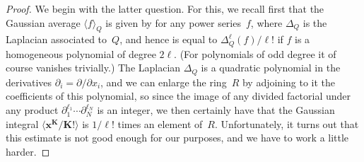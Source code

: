\documentclass[pdftex]{sigma}
\numberwithin{equation}{section}
\def\D{\Delta}
\def\pt{\partial}
\def\bK{\mathbf K}
\def\bx{\mathbf x}
\begin{document}
\begin{proof}
We begin with the latter question. For this, we recall first that the Gaussian
average $\langle f\rangle_Q$ is given by \smash{${\rm e}^{\D_Q}(f)\bigl|_{x=0}$} for any power
series~$f$, where $\D_Q$ is the Laplacian associated to~$Q$, and hence is equal to
$\D_Q^\ell(f)/\ell!$ if $f$ is a homogeneous polynomial of degree $2\ell$. (For
polynomials of odd degree it of course vanishes trivially.) The Laplacian $\D_Q$
is a quadratic polynomial in the derivatives $\pt_i=\pt/\pt x_i$, and we can enlarge
the ring~$R$ by adjoining to it the coefficients of this polynomial, so since the
image of any divided factorial under any product $\pt_1^{\ell_1}\cdots\pt_N^{\ell_N}$
is an integer, we then certainly have that the Gaussian integral
$\big\langle\bx^\bK/\bK! \big\rangle$ is $1/\ell!$ times an element of~$R$. Unfortunately,
it turns out that this estimate is not good enough for our purposes, and we have
to work a little harder.


\end{proof}
\end{document}
